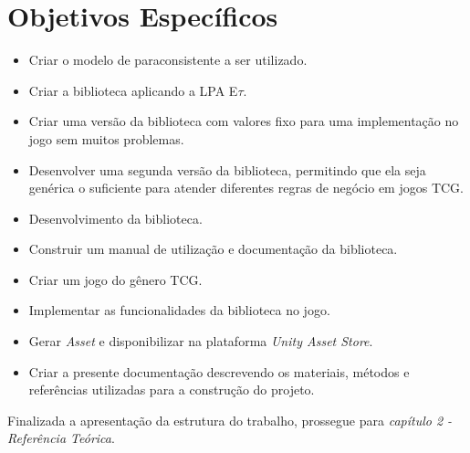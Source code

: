 \section{Objetivos Específicos}
	\begin{itemize}
		\item Criar o modelo de paraconsistente a ser utilizado.
		\item Criar a biblioteca aplicando a LPA E$\tau$.
		\item Criar uma versão da biblioteca com valores fixo para uma implementação no jogo sem muitos problemas.
		\item Desenvolver uma segunda versão da biblioteca, permitindo que ela seja genérica o suficiente para atender diferentes regras de negócio em jogos TCG.
		\item Desenvolvimento da biblioteca.
		\item Construir um manual de utilização e documentação da biblioteca.
		\item Criar um jogo do gênero TCG.
		\item Implementar as funcionalidades da biblioteca no jogo.
		\item Gerar \textit{Asset} e disponibilizar na plataforma \textit{Unity Asset Store}.
		\item Criar a presente documentação descrevendo os materiais, métodos e referências utilizadas para a construção do projeto.
	\end{itemize}

	
Finalizada a apresentação da estrutura do trabalho, prossegue para \textit{capítulo 2 - Referência Teórica}.
